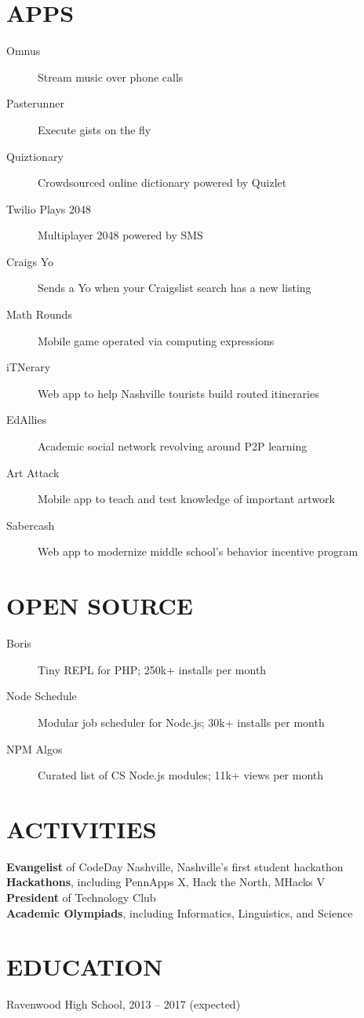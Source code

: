 \documentclass{res}
\begin{document}
\section{APPS}

\begin{description}
  \item[Omnus] Stream music over phone calls
  \item[Pasterunner] Execute gists on the fly
  \item[Quiztionary] Crowdsourced online dictionary powered by Quizlet
  \item[Twilio Plays 2048] Multiplayer 2048 powered by SMS
  \item[Craigs Yo] Sends a Yo when your Craigslist search has a new listing
  \item[Math Rounds] Mobile game operated via computing expressions
  \item[iTNerary] Web app to help Nashville tourists build routed itineraries
  \item[EdAllies] Academic social network revolving around P2P learning
  \item[Art Attack] Mobile app to teach and test knowledge of important artwork
  \item[Sabercash] Web app to modernize middle school's behavior incentive program
\end{description}

\section{OPEN SOURCE}

\begin{description}
  \item[Boris] Tiny REPL for PHP; 250k+ installs per month
  \item[Node Schedule] Modular job scheduler for Node.js; 30k+ installs per month
  \item[NPM Algos] Curated list of CS Node.js modules; 11k+ views per month
\end{description}

\section{ACTIVITIES}

\textbf{Evangelist} of CodeDay Nashville, Nashville's first student hackathon \\[1mm]
\textbf{Hackathons}, including PennApps X, Hack the North, MHacks V \\[1mm]
\textbf{President} of Technology Club \\[1mm]
\textbf{Academic Olympiads}, including Informatics, Linguistics, and Science

\section{EDUCATION}

Ravenwood High School, 2013 -- 2017 {(expected)}
\end{document}
